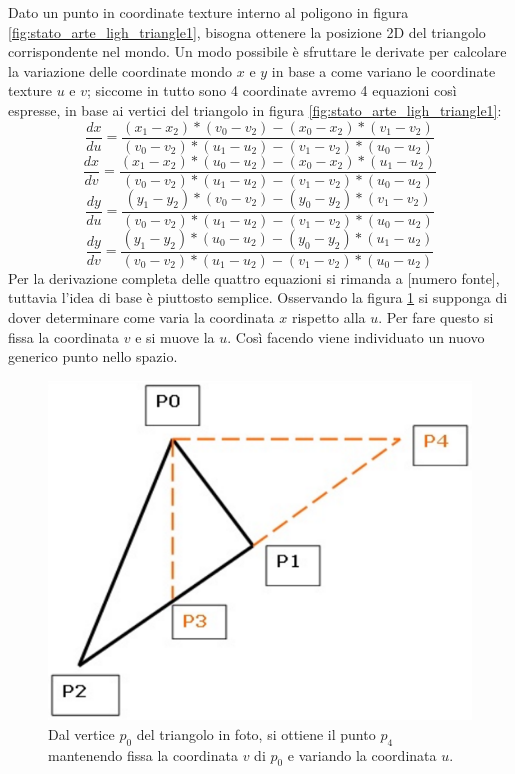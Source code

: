 Dato un punto in coordinate texture interno al poligono in figura \ref{fig:stato_arte_ligh_triangle1}, bisogna ottenere la posizione 2D del triangolo corrispondente nel mondo.
Un modo possibile è sfruttare le derivate per calcolare la variazione delle coordinate mondo $x$ e $y$ in base a come variano le coordinate texture $u$ e $v$; siccome in tutto sono 4 coordinate avremo 4 equazioni così espresse, in base ai vertici del triangolo in figura \ref{fig:stato_arte_ligh_triangle1}:
\\
\begin{equation}
\frac{dx}{du} = \frac{(x_1 - x_2)*(v_0 - v_2) - (x_0 - x_2)*(v_1 - v_2)}{(v_0 - v_2)*(u_1 - u_2) - (v_1 - v_2)*(u_0 - u_2)}
\label{dxdu}
\end{equation}
\begin{equation}
\frac{dx}{dv} = \frac{(x_1 - x_2)*(u_0 - u_2) - (x_0 - x_2)*(u_1 - u_2)}{(v_0 - v_2)*(u_1 - u_2) - (v_1 - v_2)*(u_0 - u_2)}
\label{dxdv} 
\end{equation}
\begin{equation}
\frac{dy}{du} = \frac{(y_1 - y_2)*(v_0 - v_2) - (y_0 - y_2)*(v_1 - v_2)}{(v_0 - v_2)*(u_1 - u_2) - (v_1 - v_2)*(u_0 - u_2)}
\label{dydu}
\end{equation}
\begin{equation}
\frac{dy}{dv} = \frac{(y_1 - y_2)*(u_0 - u_2) - (y_0 - y_2)*(u_1 - u_2)}{(v_0 - v_2)*(u_1 - u_2) - (v_1 - v_2)*(u_0 - u_2)} 
\label{dydv}
\end{equation}
Per la derivazione completa delle quattro equazioni si rimanda a [numero fonte], tuttavia l’idea di base è piuttosto semplice. Osservando la figura \ref{fig:stato_arte_ligh_triangle2} si supponga di dover determinare come varia la coordinata $x$ rispetto alla $u$. Per fare questo si fissa la coordinata $v$ e si muove la $u$. Così facendo viene individuato un nuovo generico punto nello spazio. 
\\
\begin{figure}[htb]
 \centering
 \includegraphics[width=0.5\linewidth]{images/chapter_stato_arte/stato_arte_ligh_triangle2.png}\hfill
 \caption[Triangolo di esempio per calcolo coordinate]{Dal vertice $p_0$ del triangolo in foto, si ottiene il punto $p_4$ mantenendo fissa la coordinata $v$ di $p_0$ e variando la coordinata $u$.}
 \label{fig:stato_arte_ligh_triangle2}
\end{figure}

